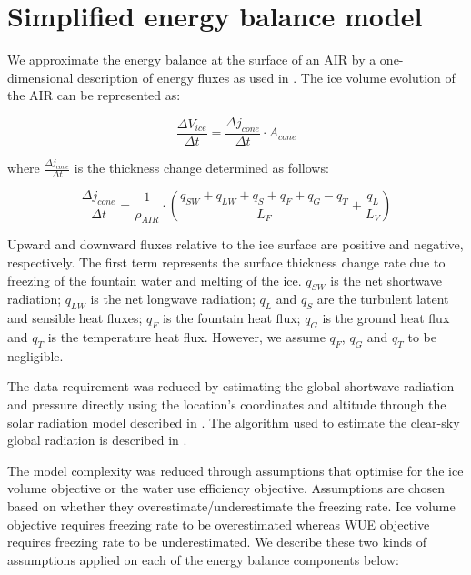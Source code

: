 \documentclass[tc, manuscript]{copernicus}
\begin{document}
\appendix

\section{Simplified energy balance model}

We approximate the energy balance at the surface of an AIR by a one-dimensional description of energy fluxes as
used in \cite{balasubramanianInfluenceMeteorologicalConditions2022}. The ice volume evolution of the AIR can be
represented as: 

\begin{equation}
  \frac{\Delta V_{ice}}{\Delta t}  =  \frac{\Delta j_{cone}}{ \Delta t} \cdot A_{cone}
	\label{eqn:freeze}
\end{equation}

where $\frac{\Delta j_{cone}}{\Delta t}$ is the thickness change determined as follows:

\begin{equation}
  \frac{\Delta j_{cone}}{\Delta t}  = \frac{1}{\rho_{AIR}} \cdot (\frac{q_{SW} + q_{LW} + q_{S} + q_{F} + q_{G} -
  q_{T}}{L_F} + \frac{q_{L}}{L_V} )
	\label{eqn:freeze}
\end{equation}

Upward and downward fluxes relative to the ice surface are positive and negative, respectively. The first term
represents the surface thickness change rate due to freezing of the fountain water and melting of the ice.
$q_{SW}$ is the net shortwave radiation; $q_{LW}$ is the net longwave radiation; $q_{L}$ and $q_{S}$ are the
turbulent latent and sensible heat fluxes; $q_{F}$ is the fountain heat flux; $q_{G}$ is the ground heat flux
and $q_{T}$ is the temperature heat flux. However, we assume $q_{F}$, $q_{G}$ and $q_{T}$ to be negligible.

The data requirement was reduced by estimating the global shortwave radiation and pressure directly using the
location's coordinates and altitude through the solar radiation model described in
\citet{holmgrenPvlibPythonPython2018}. The algorithm used to estimate the clear-sky global radiation is
described in \citet{ineichenBroadbandSimplifiedVersion2008}.  

The model complexity was reduced through assumptions that optimise for the ice volume objective or the water use
efficiency objective. Assumptions are chosen based on whether they overestimate/underestimate the freezing rate.
Ice volume objective requires freezing rate to be overestimated whereas WUE objective requires freezing rate to
be underestimated. We describe these two kinds of assumptions applied on each of the energy balance components
below: 
\end{document}
